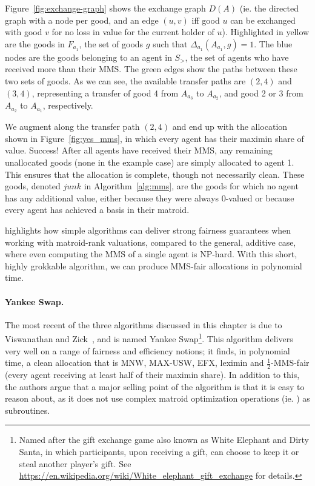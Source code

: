 Figure~\ref{fig:exchange-graph} shows the exchange graph $D(A)$ (ie. the directed graph with a node per good, and an edge $(u,v)$ iff good $u$ can be exchanged with good $v$ for no loss in value for the current holder of $u$). Highlighted in yellow are the goods in $F_{a_1}$, the set of goods $g$ such that $\Delta_{a_1}(A_{a_1}, g) = 1$. The blue nodes are the goods belonging to an agent in $S_>$, the set of agents who have received more than their MMS. The green edges show the paths between these two sets of goods. As we can see, the available transfer paths are $(2,4)$ and $(3,4)$, representing a transfer of good 4 from $A_{a_3}$ to $A_{a_2}$, and good 2 or 3 from $A_{a_2}$ to $A_{a_1}$, respectively.

We augment along the transfer path $(2,4)$ and end up with the allocation shown in Figure~\ref{fig:yes_mms}, in which every agent has their maximin share of value. Success! After all agents have received their MMS, any remaining unallocated goods (none in the example case) are simply allocated to agent 1. This ensures that the allocation is complete, though not necessarily clean. These goods, denoted $junk$ in Algorithm~\ref{alg:mms}, are the goods for which no agent has any additional value, either because they were always 0-valued or because every agent has achieved a basis in their matroid.

 highlights how simple algorithms can deliver strong fairness guarantees when working with matroid-rank valuations, compared to the general, additive case, where even computing the MMS of a single agent is NP-hard. With this short, highly grokkable algorithm, we can produce MMS-fair allocations in polynomial time.

\paragraph{Yankee Swap.} The most recent of the three algorithms discussed in this chapter is due to Viswanathan and Zick~\cite{viswanathan2023yankee}, and is named Yankee Swap\footnote{Named after the gift exchange game also known as White Elephant and Dirty Santa, in which participants, upon receiving a gift, can choose to keep it or steal another player's gift. See \href{https://en.wikipedia.org/wiki/White_elephant_gift_exchange}{https://en.wikipedia.org/wiki/White\_elephant\_gift\_exchange} for details.}. This algorithm delivers very well on a range of fairness and efficiency notions; it finds, in polynomial time, a clean allocation that is MNW, MAX-USW, EFX, leximin and $\frac{1}{2}$-MMS-fair (every agent receiving at least half of their maximin share). In addition to this, the authors argue that a major selling point of the algorithm is that it is easy to reason about, as it does not use complex matroid optimization operations (ie. ) as subroutines.

